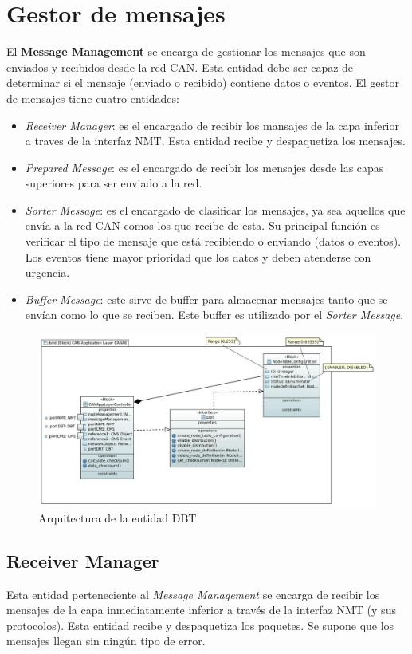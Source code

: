 \section{Gestor de mensajes}
El \textbf{Message Management} se encarga de gestionar los mensajes que son
enviados y recibidos desde la red CAN. Esta entidad debe ser capaz de determinar
si el mensaje (enviado o recibido) contiene datos o eventos. El gestor de
mensajes tiene cuatro entidades:
\begin{itemize}
\item \textit{Receiver Manager}: es el encargado de recibir los mansajes de la
  capa inferior a traves de la interfaz NMT. Esta entidad recibe y despaquetiza
  los mensajes.
\item \textit{Prepared Message}: es el encargado de recibir los mensajes desde
  las capas superiores para ser enviado a la red.
\item \textit{Sorter Message}: es el encargado de clasificar los mensajes,
  ya sea aquellos que envía a la red CAN comos los que recibe de esta. Su
  principal función es verificar  el tipo de mensaje que está recibiendo o
  enviando (datos o eventos). Los eventos tiene mayor prioridad que los datos
  y deben atenderse con urgencia.
\item \textit{Buffer Message}: este sirve de buffer para almacenar mensajes
  tanto que se envían como lo que se reciben. Este buffer es utilizado por el
  \textit{Sorter Message}.
\end{itemize}

\begin{figure}[h!]
 \centering
 \includegraphics[scale=0.4]{images/Secciones/AppendixA/DBT.JPG}
  \caption{Arquitectura de la entidad DBT}
\label{fig:DBT}
\end{figure}


\subsection{Receiver Manager}
Esta entidad perteneciente al \textit{Message Management} se encarga de recibir
los mensajes de la capa inmediatamente inferior a través de la interfaz NMT (y
sus protocolos). Esta entidad recibe y despaquetiza los paquetes. Se supone que
los mensajes llegan sin ningún tipo de error.

